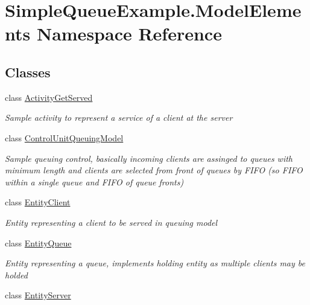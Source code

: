 \hypertarget{namespace_simple_queue_example_1_1_model_elements}{}\section{Simple\+Queue\+Example.\+Model\+Elements Namespace Reference}
\label{namespace_simple_queue_example_1_1_model_elements}
\subsection*{Classes}
\begin{DoxyCompactItemize}
\item 
class \hyperlink{class_simple_queue_example_1_1_model_elements_1_1_activity_get_served}{Activity\+Get\+Served}
\begin{DoxyCompactList}\small\item\em Sample activity to represent a service of a client at the server \end{DoxyCompactList}\item 
class \hyperlink{class_simple_queue_example_1_1_model_elements_1_1_control_unit_queuing_model}{Control\+Unit\+Queuing\+Model}
\begin{DoxyCompactList}\small\item\em Sample queuing control, basically incoming clients are assinged to queues with minimum length and clients are selected from front of queues by F\+I\+FO (so F\+I\+FO within a single queue and F\+I\+FO of queue fronts) \end{DoxyCompactList}\item 
class \hyperlink{class_simple_queue_example_1_1_model_elements_1_1_entity_client}{Entity\+Client}
\begin{DoxyCompactList}\small\item\em Entity representing a client to be served in queuing model \end{DoxyCompactList}\item 
class \hyperlink{class_simple_queue_example_1_1_model_elements_1_1_entity_queue}{Entity\+Queue}
\begin{DoxyCompactList}\small\item\em Entity representing a queue, implements holding entity as multiple clients may be holded \end{DoxyCompactList}\item 
class \hyperlink{class_simple_queue_example_1_1_model_elements_1_1_entity_server}{Entity\+Server}

\end{DoxyCompactItemize}
